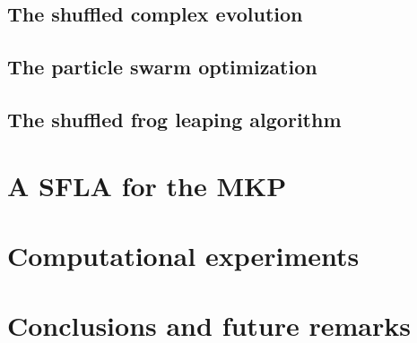 \documentclass[10pt, conference, compsocconf]{IEEEtran}
\begin{document}
\subsection{The shuffled complex evolution}

\subsection{The particle swarm optimization}
\subsection{The shuffled frog leaping algorithm}

\section{A SFLA for the MKP}
\label{sec:sfla-mkp}

\section{Computational experiments}
\label{sec:exp}

\section{Conclusions and future remarks}
\label{sec:conc}

%



\end{document}
